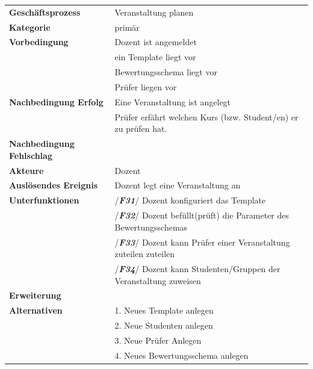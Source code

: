 		
			\begin{table}[H]
			\begin{tabular}{|ll}
				\rowcolor{hellgrau}\multicolumn{2}{l}{/\textbf{\textit{F30}}/}\\\hline
				 \textbf{Geschäftsprozess} & Veranstaltung planen \\ 
				 \textbf{Kategorie} & primär \\ 
				 \textbf{Vorbedingung} & Dozent ist angemeldet\\
				 & ein Template liegt vor \\ 
				  	& Bewertungsschema liegt vor\\
				 	& Prüfer liegen vor\\
				 \textbf{Nachbedingung Erfolg} & Eine Veranstaltung ist angelegt  \\ 
				 & Prüfer erfährt welchen Kurs (bzw.  Student/en) er zu prüfen hat.\\
				 \textbf{Nachbedingung Fehlschlag} &  \\ 
				 \textbf{Akteure} & Dozent \\ 
				 \textbf{Auslösendes Ereignis} & Dozent legt eine Veranstaltung an  \\ 
				 \textbf{Unterfunktionen} & /\textbf{\textit{F31}}/ Dozent konfiguriert das Template\\ 
				 & /\textbf{\textit{F32}}/ Dozent befüllt(prüft) die Parameter des Bewertungsschemas\\
				 &/\textbf{\textit{F33}}/ Dozent kann Prüfer einer Veranstaltung zuteilen zuteilen \\
				 & /\textbf{\textit{F34}}/ Dozent kann Studenten/Gruppen der  Veranstaltung zuweisen\\
				  \textbf{Erweiterung} &  \\ 
				 \textbf{Alternativen} & 1. Neues Template anlegen \\
				 & 2. Neue Studenten anlegen\\
				 & 3. Neue Prüfer Anlegen \\
				 & 4. Neues Bewertungsschema anlegen
				 \end{tabular} 
			\label{tab:F30}
			\end{table}
	

